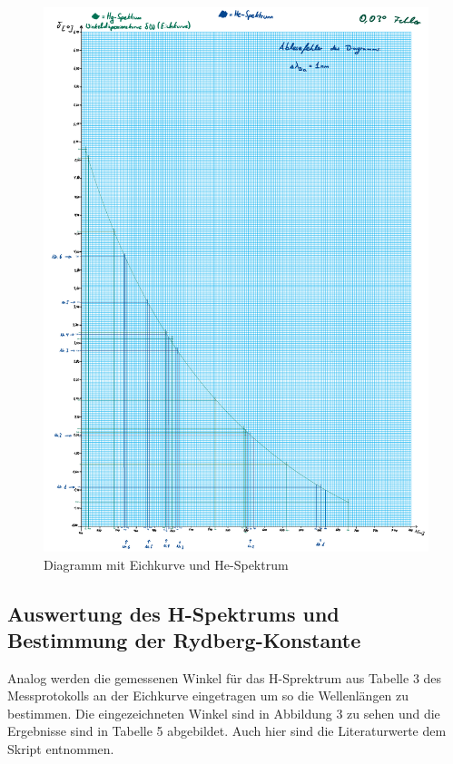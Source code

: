 \documentclass{article}
\begin{document}
\begin{figure} [p]
    \centering
    \includegraphics[width=\textwidth]{graphics/dia1.pdf}
    \caption{Diagramm mit Eichkurve und He-Spektrum}
\end{figure}

\newpage

\subsection{Auswertung des H-Spektrums und Bestimmung der Rydberg-Konstante}

Analog werden die gemessenen Winkel für das H-Sprektrum aus Tabelle 3 des Messprotokolls an der Eichkurve eingetragen um so die Wellenlängen zu bestimmen. Die eingezeichneten Winkel sind in Abbildung 3 zu sehen und die Ergebnisse sind in Tabelle 5 abgebildet. Auch hier sind die Literaturwerte dem Skript entnommen.
\end{document}
